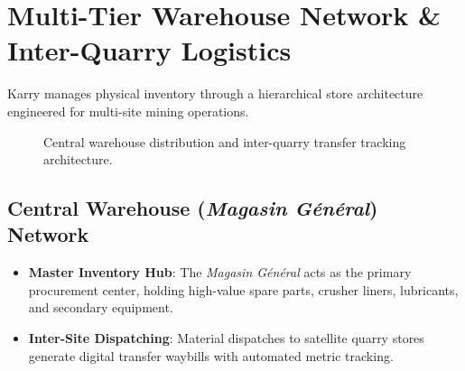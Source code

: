 \documentclass[11pt, a4paper]{article}
\begin{document}
\section{Multi-Tier Warehouse Network \& Inter-Quarry Logistics}

Karry manages physical inventory through a hierarchical store architecture engineered for multi-site mining operations.

\begin{figure}[htbp]
  \centering
  \caption{Central warehouse distribution and inter-quarry transfer tracking architecture.}
  \label{fig:warehouse_topology}
\end{figure}

\subsection{Central Warehouse (\textit{Magasin G\'en\'eral}) Network}
\begin{itemize}
    \item \textbf{Master Inventory Hub}: The \textit{Magasin G\'en\'eral} acts as the primary procurement center, holding high-value spare parts, crusher liners, lubricants, and secondary equipment.
    \item \textbf{Inter-Site Dispatching}: Material dispatches to satellite quarry stores generate digital transfer waybills with automated metric tracking.
\end{itemize}
\end{document}
